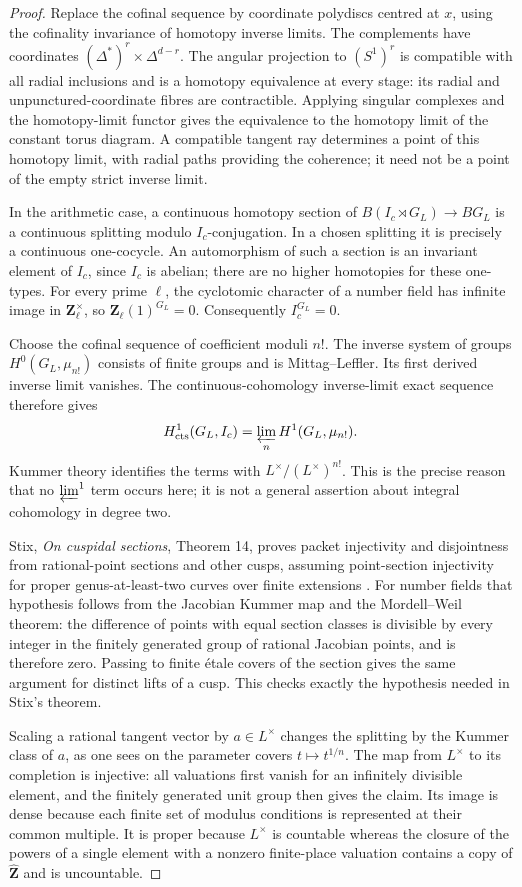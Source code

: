 \begin{proof}
Replace the cofinal sequence by coordinate polydiscs centred at $x$,
using the cofinality invariance of homotopy inverse limits. The
complements have coordinates
$(\Delta^*)^r\times\Delta^{d-r}$. The angular projection to $(S^1)^r$
is compatible with all radial inclusions and is a homotopy equivalence
at every stage: its radial and unpunctured-coordinate fibres are
contractible. Applying singular complexes and the homotopy-limit
functor gives the equivalence to the homotopy limit of the constant
torus diagram. A compatible tangent ray determines a point of this
homotopy limit, with radial paths providing the coherence; it need not
be a point of the empty strict inverse limit.

In the arithmetic case, a continuous homotopy section of
$B(I_c\rtimes G_L)\to BG_L$ is a continuous splitting modulo
$I_c$-conjugation. In a chosen splitting it is precisely a continuous
one-cocycle. An automorphism of such a section is an invariant element
of $I_c$, since $I_c$ is abelian; there are no higher homotopies for
these one-types. For every prime $\ell$, the cyclotomic character of a
number field has infinite image in $\mathbf Z_\ell^\times$, so
$\mathbf Z_\ell(1)^{G_L}=0$. Consequently $I_c^{G_L}=0$.

Choose the cofinal sequence of coefficient moduli $n!$. The inverse
system of groups $H^0(G_L,\mu_{n!})$ consists of finite groups and
is Mittag--Leffler. Its first derived inverse limit vanishes. The
continuous-cohomology inverse-limit exact sequence therefore gives
\[
 H^1_{\mathrm{cts}}(G_L,I_c)
       =\varprojlim_n H^1(G_L,\mu_{n!}).
\]
Kummer theory identifies the terms with
$L^\times/(L^\times)^{n!}$. This is the precise reason that no
$\varprojlim^1$ term occurs here; it is not a general assertion about
integral cohomology in degree two.

Stix, \emph{On cuspidal sections}, Theorem 14, proves packet
injectivity and disjointness from rational-point sections and other
cusps, assuming point-section injectivity for proper genus-at-least-two
curves over finite extensions \cite{fghStix}. For number fields that
hypothesis follows from the Jacobian Kummer map and the Mordell--Weil
theorem: the difference of points with equal section classes is divisible
by every integer in the finitely generated group of rational Jacobian
points, and is therefore zero. Passing to finite \'etale covers of the
section gives the same argument for distinct lifts of a cusp. This
checks exactly the hypothesis needed in Stix's theorem.

Scaling a rational tangent vector by $a\in L^\times$ changes the
splitting by the Kummer class of $a$, as one sees on the parameter
covers $t\mapsto t^{1/n}$. The map from $L^\times$ to its completion
is injective: all valuations first vanish for an infinitely divisible
element, and the finitely generated unit group then gives the claim.
Its image is dense because each finite set of modulus conditions is
represented at their common multiple. It is proper because $L^\times$
is countable whereas the closure of the powers of a single element
with a nonzero finite-place valuation contains a copy of
$\widehat{\mathbf Z}$ and is uncountable.
\end{proof}

